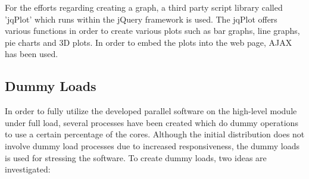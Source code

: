 For the efforts regarding creating a graph, a third party script library called 'jqPlot' \cite{jqplot} which runs within the jQuery framework is used.  The jqPlot offers various functions in order to create various plots such as bar graphs, line graphs, pie charts and 3D plots. In order to embed the plots into the web page, AJAX has been used.

\subsection{Dummy Loads}
In order to fully utilize the developed parallel software on the high-level module under full load, several processes have been created which do dummy operations to use a certain percentage of the cores. Although the initial distribution does not involve dummy load processes due to increased responsiveness, the dummy loads is used for stressing the software. To create dummy loads, two ideas are investigated:
